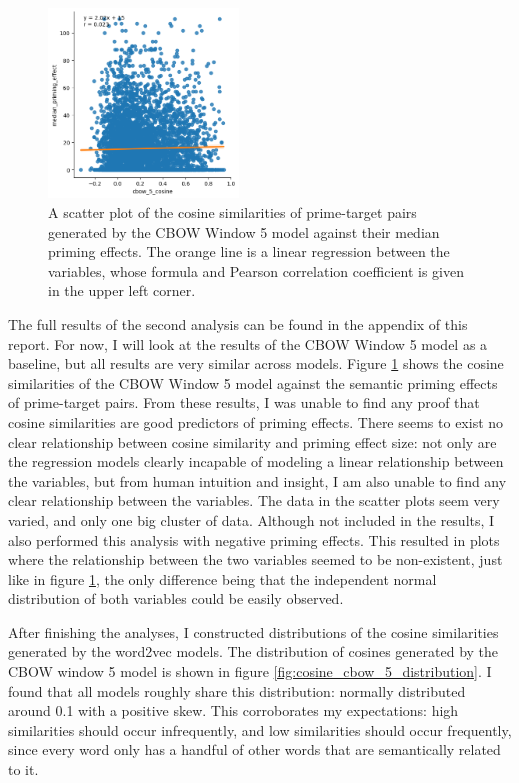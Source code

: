 \documentclass{IEEEtran}
\begin{document}
\begin{figure}
    \centering
    \includegraphics[width=0.45\textwidth]{images/cbow_5_cosine_against_priming_effect.png}
    \caption{A scatter plot of the cosine similarities of prime-target pairs generated by the CBOW Window 5 model against their median priming effects. The orange line is a linear regression between the variables, whose formula and Pearson correlation coefficient is given in the upper left corner.}
    \label{fig:cbow_5_cosine_against_priming_effect}
\end{figure}

The full results of the second analysis can be found in the appendix of this report.
For now, I will look at the results of the CBOW Window 5 model as a baseline, but all results are very similar across models.
Figure \ref{fig:cbow_5_cosine_against_priming_effect} shows the cosine similarities of the CBOW Window 5 model against the semantic priming effects of prime-target pairs.
From these results, I was unable to find any proof that cosine similarities are good predictors of priming effects.
There seems to exist no clear relationship between cosine similarity and priming effect size: not only are the regression models clearly incapable of modeling a linear relationship between the variables, but from human intuition and insight, I am also unable to find any clear relationship between the variables.
The data in the scatter plots seem very varied, and only one big cluster of data.
Although not included in the results, I also performed this analysis with negative priming effects.
This resulted in plots where the relationship between the two variables seemed to be non-existent, just like in figure \ref{fig:cbow_5_cosine_against_priming_effect}, the only difference being that the independent normal distribution of both variables could be easily observed.

After finishing the analyses, I constructed distributions of the cosine similarities generated by the word2vec models.
The distribution of cosines generated by the CBOW window 5 model is shown in figure \ref{fig:cosine_cbow_5_distribution}.
I found that all models roughly share this distribution: normally distributed around 0.1 with a positive skew.
This corroborates my expectations: high similarities should occur infrequently, and low similarities should occur frequently, since every word only has a handful of other words that are semantically related to it.
\end{document}
